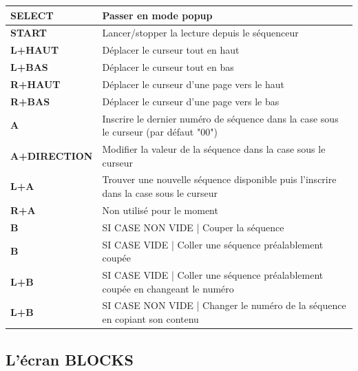 \documentclass[12pt,a4paper]{article}
\begin{document}
        \tablelasttail{\hline}
        \begin{supertabular}{|l|p{11cm}|}
        \hline
            {\bf SELECT} & Passer en mode popup \\
            \hline
            {\bf START} & Lancer/stopper la lecture depuis le séquenceur \\
            \hline
            {\bf L+HAUT} & Déplacer le curseur tout en haut \\
            \hline
            {\bf L+BAS} & Déplacer le curseur tout en bas \\
            \hline
            {\bf R+HAUT} & Déplacer le curseur d'une page vers le haut \\
            \hline
            {\bf R+BAS} & Déplacer le curseur d'une page vers le bas \\
            \hline
            {\bf A} & Inscrire le dernier numéro de séquence dans la case sous le curseur (par défaut "00") \\
            \hline
            {\bf A+DIRECTION} & Modifier la valeur de la séquence dans la case sous le curseur \\
            \hline
            {\bf L+A} & Trouver une nouvelle séquence disponible puis l'inscrire dans la case sous le curseur \\
            \hline
            {\bf R+A} & Non utilisé pour le moment \\
            \hline
            {\bf B} & SI CASE NON VIDE | Couper la séquence \\
            \hline
            {\bf B} & SI CASE VIDE | Coller une séquence préalablement coupée \\
            \hline
            {\bf L+B} & SI CASE VIDE | Coller une séquence préalablement coupée en changeant le numéro \\
            \hline
            {\bf L+B} & SI CASE NON VIDE | Changer le numéro de la séquence en copiant son contenu \\
        \hline
        \end{supertabular}
        
    \subsection{L'écran BLOCKS}
\end{document}
